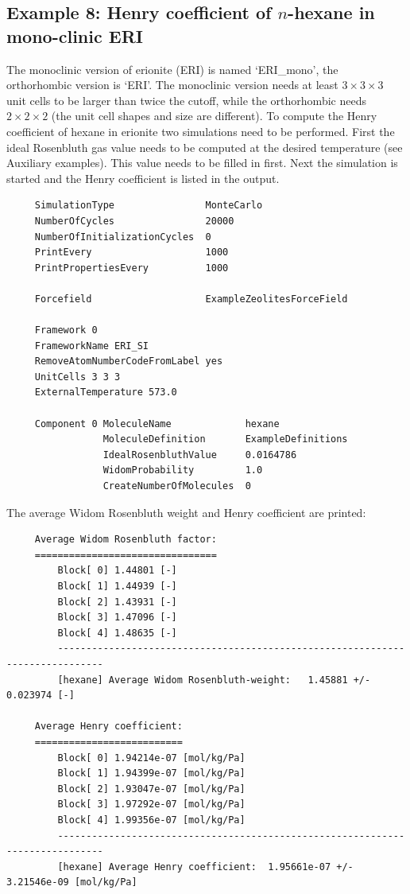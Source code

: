 \subsection*{Example 8: Henry coefficient of $n$-hexane in mono-clinic ERI}
The monoclinic version of erionite (ERI) is named `ERI\_mono', the orthorhombic version is `ERI'.
The monoclinic version needs at least $3\times3\times3$ unit cells to be larger than twice the cutoff,
while the orthorhombic needs $2\times2\times2$ (the unit cell shapes and size are different).
To compute the Henry coefficient of hexane in erionite two simulations need to be performed. First
the ideal Rosenbluth gas value needs to be computed at the desired temperature (see Auxiliary examples).
This value needs to be filled in first. Next the simulation is started and the Henry coefficient is
listed in the output.
\begin{tiny}
\begin{verbatim}
     SimulationType                MonteCarlo
     NumberOfCycles                20000
     NumberOfInitializationCycles  0
     PrintEvery                    1000
     PrintPropertiesEvery          1000
     
     Forcefield                    ExampleZeolitesForceField
     
     Framework 0
     FrameworkName ERI_SI
     RemoveAtomNumberCodeFromLabel yes
     UnitCells 3 3 3
     ExternalTemperature 573.0
     
     Component 0 MoleculeName             hexane
                 MoleculeDefinition       ExampleDefinitions
                 IdealRosenbluthValue     0.0164786
                 WidomProbability         1.0
                 CreateNumberOfMolecules  0
\end{verbatim}
\end{tiny}

The average Widom Rosenbluth weight and Henry coefficient are printed:
\begin{tiny}
\begin{verbatim}
     Average Widom Rosenbluth factor:
     ================================
         Block[ 0] 1.44801 [-]
         Block[ 1] 1.44939 [-]
         Block[ 2] 1.43931 [-]
         Block[ 3] 1.47096 [-]
         Block[ 4] 1.48635 [-]
         ------------------------------------------------------------------------------
         [hexane] Average Widom Rosenbluth-weight:   1.45881 +/- 0.023974 [-]
     
     Average Henry coefficient:
     ==========================
         Block[ 0] 1.94214e-07 [mol/kg/Pa]
         Block[ 1] 1.94399e-07 [mol/kg/Pa]
         Block[ 2] 1.93047e-07 [mol/kg/Pa]
         Block[ 3] 1.97292e-07 [mol/kg/Pa]
         Block[ 4] 1.99356e-07 [mol/kg/Pa]
         ------------------------------------------------------------------------------
         [hexane] Average Henry coefficient:  1.95661e-07 +/- 3.21546e-09 [mol/kg/Pa]
\end{verbatim}
\end{tiny}

